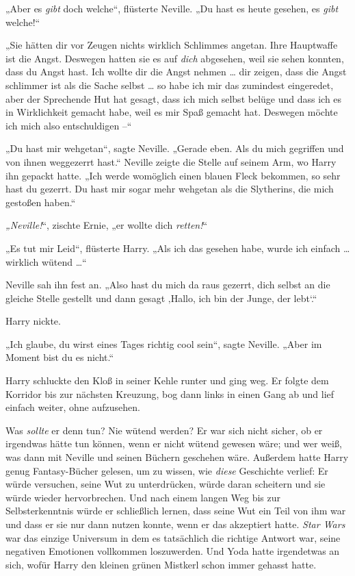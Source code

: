 „Aber es \emph{gibt} doch welche“, flüsterte Neville. „Du hast es heute gesehen, es \emph{gibt} welche!“ 

„Sie hätten dir vor Zeugen nichts wirklich Schlimmes angetan. Ihre Hauptwaffe ist die Angst. Deswegen hatten sie es auf \emph{dich} abgesehen, weil sie sehen konnten, dass du Angst hast. Ich wollte dir die Angst nehmen … dir zeigen, dass die Angst schlimmer ist als die Sache selbst … so habe ich mir das zumindest eingeredet, aber der Sprechende Hut hat gesagt, dass ich mich selbst belüge und dass ich es in Wirklichkeit gemacht habe, weil es mir Spaß gemacht hat. Deswegen möchte ich mich also entschuldigen –“ 

„Du hast mir wehgetan“, sagte Neville. „Gerade eben. Als du mich gegriffen und von ihnen weggezerrt hast.“ Neville zeigte die Stelle auf seinem Arm, wo Harry ihn gepackt hatte. „Ich werde womöglich einen blauen Fleck bekommen, so sehr hast du gezerrt. Du hast mir sogar mehr wehgetan als die Slytherins, die mich gestoßen haben.“ 

\emph{„Neville!}“, zischte Ernie, „er wollte dich \emph{retten!}“ 

„Es tut mir Leid“, flüsterte Harry. „Als ich das gesehen habe, wurde ich einfach … wirklich wütend …“ 

Neville sah ihn fest an. „Also hast du mich da raus gezerrt, dich selbst an die gleiche Stelle gestellt und dann gesagt ‚Hallo, ich bin der Junge, der lebt‘.“ 

Harry nickte. 

„Ich glaube, du wirst eines Tages richtig cool sein“, sagte Neville. „Aber im Moment bist du es nicht.“ 

Harry schluckte den Kloß in seiner Kehle runter und ging weg. Er folgte dem Korridor bis zur nächsten Kreuzung, bog dann links in einen Gang ab und lief einfach weiter, ohne aufzusehen. 

Was \emph{sollte} er denn tun? Nie wütend werden? Er war sich nicht sicher, ob er irgendwas hätte tun können, wenn er nicht wütend gewesen wäre; und wer weiß, was dann mit Neville und seinen Büchern geschehen wäre. Außerdem hatte Harry genug Fantasy-Bücher gelesen, um zu wissen, wie \emph{diese} Geschichte verlief: Er würde versuchen, seine Wut zu unterdrücken, würde daran scheitern und sie würde wieder hervorbrechen. Und nach einem langen Weg bis zur Selbsterkenntnis würde er schließlich lernen, dass seine Wut ein Teil von ihm war und dass er sie nur dann nutzen konnte, wenn er das akzeptiert hatte. \emph{Star Wars} war das einzige Universum in dem es tatsächlich die richtige Antwort war, seine negativen Emotionen vollkommen loszuwerden. Und Yoda hatte irgendetwas an sich, wofür Harry den kleinen grünen Mistkerl schon immer gehasst hatte. 

